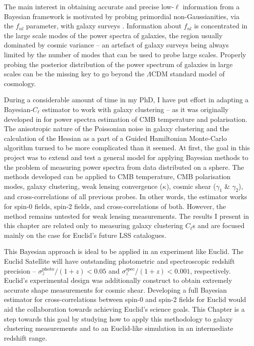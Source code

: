 \qquad The main interest in obtaining accurate and precise low-$\ell$ information from a Bayesian framework is motivated by probing primordial non-Gaussianities, via the $f_{nl}$ parameter, with galaxy surveys \citep{2004Bartolo-fnl, 2008Dalal-fnl,2011Hamaus-fnl,2014Boris-fnl}. Information about $f_{nl}$ is concentrated in the large scale modes of the power spectra of galaxies, the region usually dominated by cosmic variance -- an artefact of galaxy surveys being always limited by the number of modes that can be used to probe large scales. Properly probing the posterior distribution of the power spectrum of galaxies in large scales can be the missing key to go beyond the $\Lambda$CDM standard model of cosmology.

\qquad During a considerable amount of time in my PhD, I have put effort in adapting a Bayesian-$C_{\ell}$ estimator to work with galaxy clustering -- as it was originally developed in \cite{SreeThesis} for power spectra estimation of CMB temperature and polarisation. The anisotropic nature of the Poissonian noise in galaxy clustering and the calculation of the Hessian as a part of a Guided Hamiltonian Monte-Carlo algorithm \citep{2013-GuidedHamiltonian} turned to be more complicated than it seemed. At first, the goal in this project was to extend and test a general model for applying Bayesian methods to the problem of measuring power spectra from data distributed on a sphere. The methods developed can be applied to CMB temperature, CMB polarisation modes, galaxy clustering, weak lensing convergence ($\kappa$), cosmic shear ($\gamma_1$ \& $\gamma_2$), and cross-correlations of all previous probes. In other words, the estimator works for spin-0 fields, spin-2 fields, and cross-correlations of both. However, the method remains untested for weak lensing measurements. The results I present in this chapter are related only to measuring galaxy clustering $C_{\ell}$s and are focused mainly on the case for Euclid's future LSS catalogues.

\qquad This Bayesian approach is ideal to be applied in an experiment like Euclid. The Euclid Satellite will have outstanding photometric and spectroscopic redshift precision -- $\sigma^{\text{photo}}_z/(1+z) < 0.05$ and  $\sigma^{\text{spec}}_z/(1+z)< 0.001$, respectively. Euclid's experimental design was additionally construct to obtain extremely accurate shape measurements for cosmic shear. Developing a full Bayesian estimator for cross-correlations between spin-0 and spin-2 fields for Euclid would aid the collaboration towards achieving Euclid's science goals. This Chapter is a step towards this goal by studying how to apply this methodology to galaxy clustering measurements and to an Euclid-like simulation in an intermediate redshift range.

